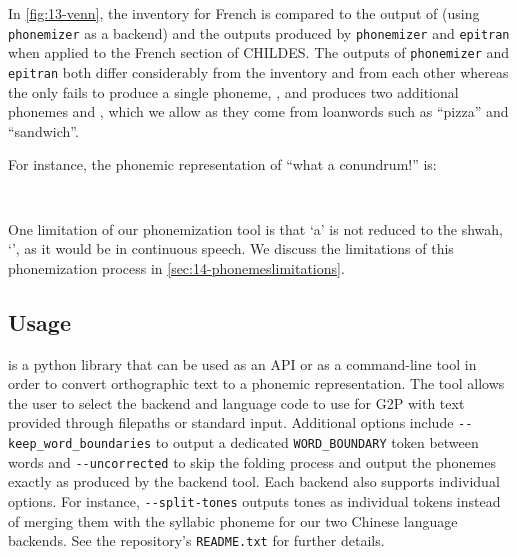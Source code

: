 In \cref{fig:13-venn}, the \phoible inventory for French is compared to the output of \gpp (using \texttt{phonemizer} as a backend) and the outputs produced by \texttt{phonemizer} and \texttt{epitran} when applied to the French section of CHILDES. The outputs of \texttt{phonemizer} and \texttt{epitran} both differ considerably from the inventory and from each other whereas the \gpp only fails to produce a single phoneme, \ttipa{\textturnh}, and produces two additional phonemes  and , which we allow as they come from loanwords such as ``pizza'' and ``sandwich''. 

For instance, the phonemic representation of ``what a conundrum!'' is:

\vspace{-2mm}
\begin{center}
\texttt{ \textvisiblespace~ \textvisiblespace~ \textvisiblespace~}
\end{center}
\vspace{-1mm}

\noindent
One limitation of our phonemization tool is that `a' is not reduced to the shwah, `', as it would be in continuous speech. We discuss the limitations of this phonemization process in \cref{sec:14-phonemeslimitations}. 

\subsection{Usage}\label{sec:13-usage}

\gpp is a python library that can be used as an API or as a command-line tool in order to convert orthographic text to a phonemic representation. The tool allows the user to select the backend and language code to use for G2P with text provided through filepaths or standard input. Additional options include \verb|--keep_word_boundaries| to output a dedicated \texttt{WORD\_BOUNDARY} token between words and \verb|--uncorrected| to skip the folding process and output the phonemes exactly as produced by the backend tool. Each backend also supports individual options. For instance, \verb|--split-tones| outputs tones as individual tokens instead of merging them with the syllabic phoneme for our two Chinese language backends. See the repository's \texttt{README.txt} for further details.

\section{\ipachildes}\label{sec:13-ipachildes}

